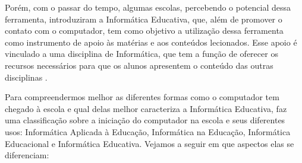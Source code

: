 Porém, com o passar do tempo, algumas escolas, percebendo o potencial dessa
ferramenta, introduziram a Informática Educativa, que, além de promover o
contato com o computador, tem como objetivo a utilização dessa ferramenta
como instrumento de apoio às matérias e aos conteúdos lecionados. Esse apoio
é vinculado a uma disciplina de Informática, que tem a função de oferecer os
recursos necessários para que os alunos apresentem o conteúdo das outras
disciplinas \cite{fonseca_et_al:2005}.

Para compreendermos melhor as diferentes formas como o computador tem
chegado à escola e qual delas melhor caracteriza a Informática Educativa,
 faz uma classificação sobre a iniciação do computador na
escola e seus diferentes usos: Informática Aplicada à Educação, Informática
na Educação, Informática Educacional e Informática Educativa. Vejamos a
seguir em que aspectos elas se diferenciam:

